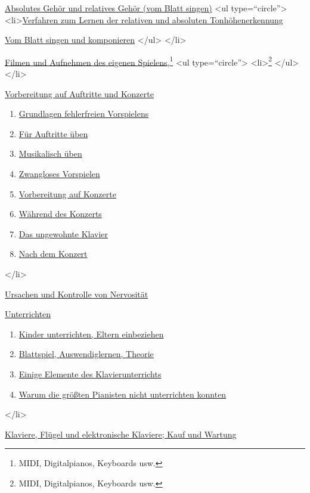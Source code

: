  \item \hyperlink{c1iii12}{Absolutes Gehör und relatives Gehör (vom Blatt singen)}
   <ul type=\enquote{circle}>
    <li>\hyperlink{c1iii12tonhoehe}{Verfahren zum Lernen der relativen und absoluten Tonhöhenerkennung}
    \item \hyperlink{c1iii12blatt}{Vom Blatt singen und komponieren}
   </ul>
 </li>
 \item \hyperlink{c1iii13}{Filmen und Aufnehmen des eigenen Spielens,\footnote{MIDI, Digitalpianos, Keyboards usw.}}
     <ul type=\enquote{circle}>
      <li>\hyperlink{c1iii13MIDI}{\footnote{MIDI, Digitalpianos, Keyboards usw.}}
    </ul>
 </li>
 \item \hyperlink{c1iii14}{Vorbereitung auf Auftritte und Konzerte}
  \begin{enumerate}[label={\alph*.}] 
   <li>\hyperlink{c1iii14a}{Nutzen und Risiken von Auftritten und Konzerten}
   \item \hyperlink{c1iii14b}{Grundlagen fehlerfreien Vorspielens}
   \item \hyperlink{c1iii14c}{Für Auftritte üben}
   \item \hyperlink{c1iii14d}{Musikalisch üben}
   \item \hyperlink{c1iii14e}{Zwangloses Vorspielen}
   \item \hyperlink{c1iii14f}{Vorbereitung auf Konzerte}
   \item \hyperlink{c1iii14g}{Während des Konzerts}
   \item \hyperlink{c1iii14h}{Das ungewohnte Klavier}
   \item \hyperlink{c1iii14i}{Nach dem Konzert}
   \end{enumerate}
 </li>
 \item \hyperlink{c1iii15}{Ursachen und Kontrolle von Nervosität}
 \item \hyperlink{c1iii16}{Unterrichten}
  \begin{enumerate}[label={\alph*.}] 
   <li>\hyperlink{c1iii16a}{Lehrer}
   \item \hyperlink{c1iii16b}{Kinder unterrichten, Eltern einbeziehen}
   \item \hyperlink{c1iii16c}{Blattspiel, Auswendiglernen, Theorie}
   \item \hyperlink{c1iii16d}{Einige Elemente des Klavierunterrichts}
   \item \hyperlink{c1iii16e}{Warum die größten Pianisten nicht unterrichten konnten}
   \end{enumerate}
 </li>
 \item \hyperlink{c1iii17}{Klaviere, Flügel und elektronische Klaviere; Kauf und Wartung}
